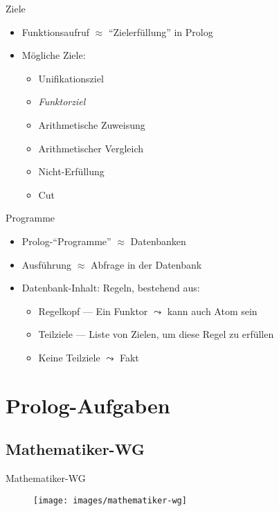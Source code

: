 \documentclass{beamer}
\begin{document}
\begin{frame}{Ziele}

	\begin{itemize}
		\item Funktionsaufruf $\approx$ \enquote{Zielerfüllung} in Prolog
		\item Mögliche Ziele:
		\begin{itemize}
			\item Unifikationsziel
                        \item \emph{Funktorziel}
			\item Arithmetische Zuweisung
			\item Arithmetischer Vergleich
			\item Nicht-Erfüllung
			\item Cut
		\end{itemize}
	\end{itemize}
\end{frame}


\begin{frame}{Programme}
	\begin{itemize}
		\item Prolog-\enquote{Programme} $\approx$ Datenbanken
		\item Ausführung $\approx$ Abfrage in der Datenbank
		\item Datenbank-Inhalt: Regeln, bestehend aus:
		\begin{itemize}
			\item Regelkopf --- Ein Funktor $\leadsto$ kann auch Atom sein
			\item Teilziele --- Liste von Zielen, um diese Regel zu erfüllen
			\item Keine Teilziele $\leadsto$ Fakt
		\end{itemize}
	\end{itemize}
\end{frame}

\section{Prolog-Aufgaben}

\subsection{Mathematiker-WG}

\begin{frame}{Mathematiker-WG}
	\begin{figure}
		\texttt{[image: images/mathematiker-wg]}
	\end{figure}
\end{frame}
\end{document}
